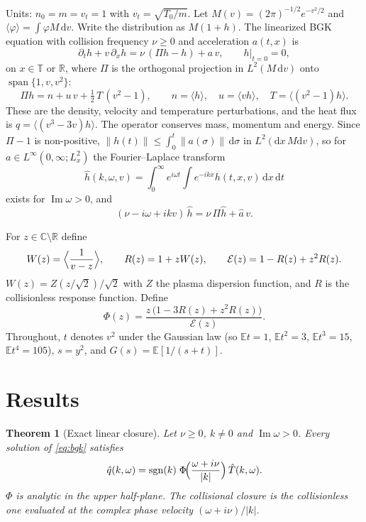 \documentclass[11pt]{article}
\newcommand{\dd}{\mathrm{d}}
\newcommand{\E}{\mathbb{E}}
\newcommand{\sgn}{\operatorname{sgn}}
\newcommand{\vt}{v_t}
\newcommand{\avg}[1]{\langle #1\rangle}
\renewcommand{\Im}{\operatorname{Im}}
\newtheorem{theorem}{Theorem}
\theoremstyle{remark}
\begin{document}
Units: $n_0 = m = \vt = 1$ with $\vt = \sqrt{T_0/m}$. Let
$M(v) = (2\pi)^{-1/2}e^{-v^2/2}$ and $\avg{\varphi} = \int\varphi M\,\dd v$.
Write the distribution as $M(1+h)$. The linearized BGK equation with
collision frequency $\nu\ge0$ and acceleration $a(t,x)$ is
\begin{equation}
  \partial_t h + v\,\partial_x h = \nu\,(\Pi h - h) + a\,v,
  \qquad h|_{t=0} = 0,
  \label{eq:bgk}
\end{equation}
on $x\in\mathbb{T}$ or $\mathbb{R}$, where $\Pi$ is the orthogonal projection
in $L^2(M\,\dd v)$ onto $\operatorname{span}\{1,v,v^2\}$:
\[
  \Pi h = n + u\,v + \tfrac12\,T\,(v^2-1),\qquad
  n = \avg{h},\quad u = \avg{vh},\quad T = \avg{(v^2-1)h}.
\]
These are the density, velocity and temperature perturbations, and the heat
flux is $q = \avg{(v^3-3v)h}$. The operator conserves mass, momentum and
energy. Since $\Pi-1$ is non-positive,
$\|h(t)\|\le\int_0^t\|a(\sigma)\|\,\dd\sigma$ in $L^2(\dd x\,M\dd v)$, so for
$a\in L^\infty(0,\infty;L^2_x)$ the Fourier--Laplace transform
\[
  \hat h(k,\omega,v) = \int_0^\infty e^{i\omega t}\int e^{-ikx}h(t,x,v)\,\dd x\,\dd t
\]
exists for $\Im\omega>0$, and
\begin{equation}
  (\nu - i\omega + ikv)\,\hat h = \nu\,\Pi\hat h + \hat a\,v .
  \label{eq:fl}
\end{equation}

For $z\in\mathbb{C}\setminus\mathbb{R}$ define
\begin{equation}
  W(z) = \Bigl\langle\frac{1}{v-z}\Bigr\rangle,\qquad
  R(z) = 1 + zW(z),\qquad
  \mathcal{E}(z) = 1 - R(z) + z^2R(z).
\end{equation}
$W(z) = Z(z/\sqrt2)/\sqrt2$ with $Z$ the plasma dispersion function, and $R$
is the collisionless response function. Define
\begin{equation}
  \Phi(z) = \frac{z\,\bigl(1 - 3R(z) + z^2R(z)\bigr)}{\mathcal{E}(z)} .
  \label{eq:Phi}
\end{equation}
Throughout, $t$ denotes $v^2$ under the Gaussian law (so $\E t = 1$,
$\E t^2 = 3$, $\E t^3 = 15$, $\E t^4 = 105$), $s = y^2$, and
$G(s) = \E[1/(s+t)]$.

\section{Results}

\begin{theorem}[Exact linear closure]\label{thm:exact}
Let $\nu\ge0$, $k\ne0$ and $\Im\omega>0$. Every solution of \eqref{eq:bgk}
satisfies
\begin{equation}
  \hat q(k,\omega) = \sgn(k)\;\Phi\!\Bigl(\frac{\omega+i\nu}{|k|}\Bigr)\,
  \hat T(k,\omega) .
  \label{eq:exact}
\end{equation}
$\Phi$ is analytic in the upper half-plane. The collisional closure is the
collisionless one evaluated at the complex phase velocity
$(\omega+i\nu)/|k|$.
\end{theorem}
\end{document}
